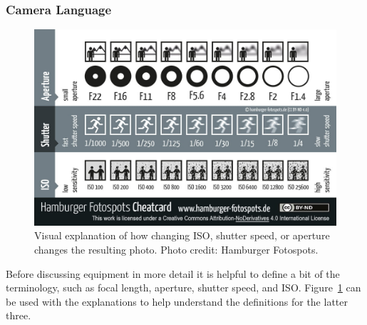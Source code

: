 \documentclass{article}
\newcommand{\contributed}[1]{%
    \par\noindent
    \begingroup
    \setlength{\leftskip}{1em}%
    \itshape
    Contributors: #1
    \par
    \endgroup
    \vspace{0.5em}
}
\begin{document}
\subsubsection{Camera Language}

\begin{figure}[h!]
\begin{centering}
  \includegraphics[width=\linewidth]{Fig11_HamburgerFotospots.jpg}
  \caption{Visual explanation of how changing ISO, shutter speed, or aperture changes the resulting photo. Photo credit: Hamburger Fotospots.}
  \label{cheatcard}
  \end{centering}
\end{figure}

Before discussing equipment in more detail it is helpful to define a bit of the terminology, such as focal length, aperture, shutter speed, and ISO. Figure~\ref{cheatcard} can be used with the explanations to help understand the definitions for the latter three.
\end{document}
